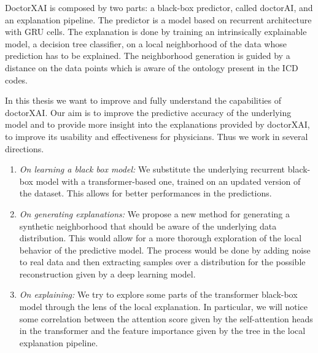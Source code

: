 \documentclass[]{marticle}
\begin{document}
DoctorXAI is composed by two parts: a black-box predictor, called doctorAI, and an explanation
pipeline. The predictor is a model based on recurrent architecture with GRU cells. The explanation
is done by training an intrinsically explainable model, a decision tree classifier, on a local
neighborhood of the data whose prediction has to be explained. The neighborhood generation is guided
by a distance on the data points which is aware of the ontology present in the ICD codes.

In this thesis we want to improve and fully understand the capabilities of doctorXAI. Our aim is to
improve the predictive accuracy of the underlying model and to provide more insight into the
explanations provided by doctorXAI, to improve its usability and effectiveness for physicians. Thus
we work in several directions.
\begin{enumerate}
\item \emph{On learning a black box model:} We substitute the underlying recurrent black-box model
with a transformer-based one, trained on an updated version of the dataset. This allows for better
performances in the predictions.

\item \emph{On generating explanations:}  We propose a new method for generating a synthetic
neighborhood that should be aware of the underlying data distribution. This would allow for a more
thorough exploration of the local behavior of the predictive model. The process would be done by
adding noise to real data and then extracting samples over a distribution for the possible
reconstruction given by a deep learning model.

\item \emph{On explaining:} We try to explore some parts of the transformer black-box model
through the lens of the local explanation. In particular, we will notice some correlation between the
attention score given by the self-attention heads in the transformer and the feature importance
given by the tree in the local explanation pipeline.
\end{enumerate}
\end{document}
